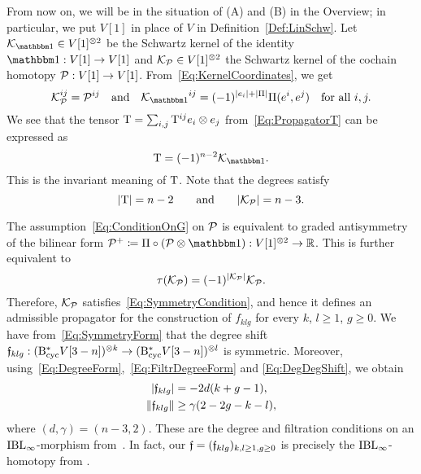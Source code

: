 \documentclass[\MainFolder/Text.tex]{subfiles}
\begin{document}
From now on, we will be in the situation of (A) and (B) in the Overview; in particular, we put $V[1]$ in place of $V$ in Definition~\ref{Def:LinSchw}. Let $\Kern_{\Id} \in V[1]^{\otimes 2}$ be the Schwartz kernel of the identity $\Id: V[1]\rightarrow V[1]$ and $\mathcal{K}_{\mathcal{P}} \in V[1]^{\otimes 2}$ the Schwartz kernel of the cochain homotopy $\mathcal{P}: V[1] \rightarrow V[1]$. From~\eqref{Eq:KernelCoordinates}, we get
\begin{equation*} 
\Kern_{\Htp}^{ij} = \Htp^{ij} \quad \text{and} \quad {\Kern_{\Id}}^{ij} = (-1)^{\Abs{e_i} + \Abs{\Pair}} \Pair(e^i,e^j)\quad\text{for all }i,j. 
\end{equation*}
We see that the tensor $\mathrm{T} = \sum_{i,j} \mathrm{T}^{ij} e_i \otimes e_j$ from~\eqref{Eq:PropagatorT} can be expressed as
\begin{equation*}
\TKer = (-1)^{n-2} \Kern_{\Id}.
\end{equation*}
This is the invariant meaning of $\mathrm{T}$. Note that the degrees satisfy 
\[ |\mathrm{T}| = n-2\qquad\text{and}\qquad|\mathcal{K}_{\mathcal{P}}| = n - 3. \]

The assumption~\eqref{Eq:ConditionOnG} on $\mathcal{P}$ is equivalent to graded antisymmetry of the bilinear form $\Htp^+\coloneqq \Pair\circ (\Htp\otimes \Id): V[1]^{\otimes 2} \rightarrow \R$. This is further equivalent to
\[ \tau(\mathcal{K}_{\mathcal{P}}) = (-1)^{|\mathcal{K}_{\mathcal{P}}|}\mathcal{K}_{\mathcal{P}}. \]
Therefore, $\mathcal{K}_{\mathcal{P}}$ satisfies~\eqref{Eq:SymmetryCondition}, and hence it defines an admissible propagator for the construction of $f_{klg}$ for every $k$, $l\ge 1$, $g\ge 0$. We have from~\eqref{Eq:SymmetryForm} that the degree shift $\mathfrak{f}_{klg}: (\mathrm{B}_{\mathrm{cyc}}^* V[3-n])^{\otimes k} \rightarrow (\mathrm{B}_{\mathrm{cyc}}^* V[3-n])^{\otimes l}$ is symmetric. Moreover, using~\eqref{Eq:DegreeForm},~\eqref{Eq:FiltrDegreeForm} and \eqref{Eq:DegDegShift}, we obtain
\[\begin{aligned}
|\mathfrak{f}_{klg}| &= - 2d(k+g-1), \\
\| \mathfrak{f}_{klg} \|&\ge \gamma (2-2g-k-l),
\end{aligned}\]
where $(d,\gamma) = (n-3,2)$. These are the degree and filtration conditions on an $\mathrm{IBL}_\infty$-morphism from~\cite[Definition~2.8 and (8.3)]{Cieliebak2015}. In fact, our $\mathfrak{f}=(\mathfrak{f}_{klg})_{k,l\ge 1, g\ge 0}$ is precisely the $\mathrm{IBL}_\infty$-homotopy from \cite[Theorem 11.3]{Cieliebak2015}.
\end{document}
